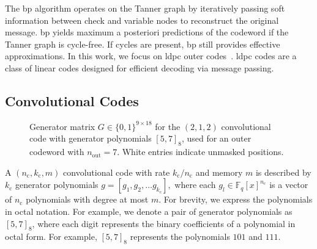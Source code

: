 \documentclass[conference,letterpaperu]{IEEEtran}
\newcommand{\sbin}{\ensuremath{\{ 0, 1\}}}
\newcommand{\nout}{\ensuremath{n_{\text{out}}}}
\newcommand{\convn}{\ensuremath{n_\text{c}}}
\newcommand{\convk}{\ensuremath{k_\text{c}}}
\newcommand{\alphabet}{\ensuremath{\mathbb{F}_q}}
\begin{document}
The \ac{bp} algorithm operates on the Tanner graph by iteratively passing soft information between check and variable nodes to reconstruct the original message. \ac{bp} yields maximum a posteriori predictions of the codeword if the Tanner graph is cycle-free. If cycles are present, \ac{bp} still provides effective approximations. In this work, we focus on \ac{ldpc} outer codes~\cite{gallagerLowdensityParitycheckCodes1962a}. \ac{ldpc} codes are a class of linear codes designed for efficient decoding via message passing.
\subsection{Convolutional Codes}
\label{sec:bgConvCode}
\begin{figure}[t]
\centering
{}
    \caption{Generator matrix $G \in \sbin^{9 \times 18}$ for the $(2, 1, 2)$ convolutional code with generator polynomials $[5, 7]_8$, used for an outer codeword with $\nout = 7$. White entries indicate unmasked positions.}
    \label{fig:generator_conv}
\end{figure}
A $(\convn, \convk, m)$ convolutional code with rate $\convk / \convn$ and memory $m$ is described by $\convk$ generator polynomials $g = [g_1, g_2, \ldots g_{\convk}],$ where each $g_l \in \alphabet[x]^{\convn}$ is a vector of $\convn$ polynomials with degree at most $m$. For brevity, we express the polynomials in octal notation. For example, we denote a pair of generator polynomials as \([5,7]_8\), where each digit represents the binary coefficients of a polynomial in octal form. For example, \([5,7]_8\) represents the polynomials \(101\) and \(111\). 
\end{document}
